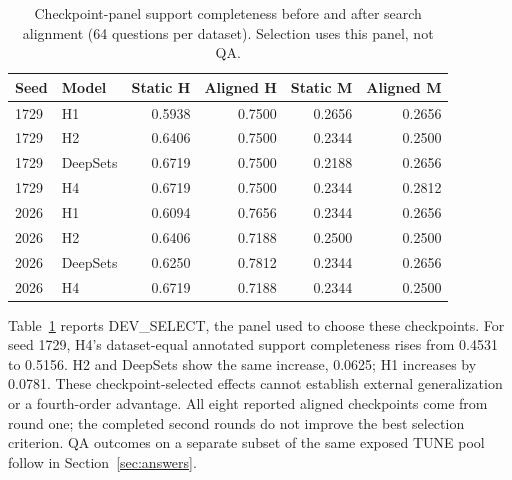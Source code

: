 \begin{table}[t]\centering\small
\caption{Checkpoint-panel support completeness before and after search alignment (64 questions per dataset). Selection uses this panel, not QA.}
\label{tab:aligned}
\begin{tabular}{llrrrr}\toprule
Seed & Model & Static H & Aligned H & Static M & Aligned M\\\midrule
1729 & H1 & 0.5938 & 0.7500 & 0.2656 & 0.2656\\
1729 & H2 & 0.6406 & 0.7500 & 0.2344 & 0.2500\\
1729 & DeepSets & 0.6719 & 0.7500 & 0.2188 & 0.2656\\
1729 & H4 & 0.6719 & 0.7500 & 0.2344 & 0.2812\\
2026 & H1 & 0.6094 & 0.7656 & 0.2344 & 0.2656\\
2026 & H2 & 0.6406 & 0.7188 & 0.2500 & 0.2500\\
2026 & DeepSets & 0.6250 & 0.7812 & 0.2344 & 0.2656\\
2026 & H4 & 0.6719 & 0.7188 & 0.2344 & 0.2500\\
\bottomrule\end{tabular}\end{table}

Table~\ref{tab:aligned} reports DEV\_SELECT, the panel used to choose these
checkpoints. For seed 1729, H4's dataset-equal annotated support completeness
rises from 0.4531 to 0.5156. H2 and DeepSets show the same increase, 0.0625;
H1 increases by 0.0781. These checkpoint-selected effects cannot establish
external generalization or a fourth-order advantage. All eight reported
aligned checkpoints come from round one; the completed second rounds do
not improve the best selection criterion. QA outcomes on a separate subset
of the same exposed TUNE pool follow in Section~\ref{sec:answers}.
